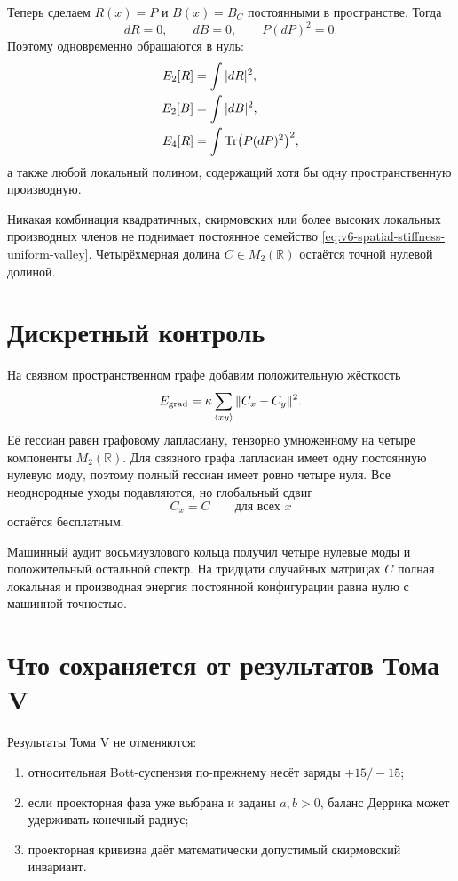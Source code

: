 Теперь сделаем $R(x)=P$ и $B(x)=B_C$ постоянными в пространстве. Тогда
\begin{equation}
 dR=0,
 \qquad dB=0,
 \qquad P(dP)^2=0.
\end{equation}
Поэтому одновременно обращаются в нуль:
\begin{align}
 E_2[R]&=\int|dR|^2,\\
 E_2[B]&=\int|dB|^2,\\
 E_4[R]&=\int\operatorname{Tr}\bigl(P(dP)^2\bigr)^2,
\end{align}
а также любой локальный полином, содержащий хотя бы одну пространственную
производную.

\begin{theorem}
Никакая комбинация квадратичных, скирмовских или более высоких локальных
производных членов не поднимает постоянное семейство
\eqref{eq:v6-spatial-stiffness-uniform-valley}. Четырёхмерная долина
$C\in M_2(\mathbb R)$ остаётся точной нулевой долиной.
\end{theorem}

\section{Дискретный контроль}

На связном пространственном графе добавим положительную жёсткость
\begin{equation}
 E_{\rm grad}
 =\kappa\sum_{\langle xy\rangle}\|C_x-C_y\|^2.
\end{equation}
Её гессиан равен графовому лапласиану, тензорно умноженному на четыре
компоненты $M_2(\mathbb R)$. Для связного графа лапласиан имеет одну
постоянную нулевую моду, поэтому полный гессиан имеет ровно четыре нуля.
Все неоднородные уходы подавляются, но глобальный сдвиг
\begin{equation}
 C_x=C
 \qquad\text{для всех }x
\end{equation}
остаётся бесплатным.

Машинный аудит восьмиузлового кольца получил четыре нулевые моды и
положительный остальной спектр. На тридцати случайных матрицах $C$ полная
локальная и производная энергия постоянной конфигурации равна нулю с
машинной точностью.

\section{Что сохраняется от результатов Тома V}

Результаты Тома V не отменяются:
\begin{enumerate}
 \item относительная Bott-суспензия по-прежнему несёт заряды $+15/-15$;
 \item если проекторная фаза уже выбрана и заданы $a,b>0$, баланс
 Деррика может удерживать конечный радиус;
 \item проекторная кривизна даёт математически допустимый скирмовский
 инвариант.
\end{enumerate}

